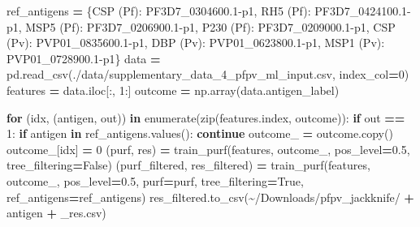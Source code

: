 \documentclass[
  11pt,
  oneside]{book}
\newenvironment{Shaded}{\begin{snugshade}}{\end{snugshade}}
\newcommand{\BuiltInTok}[1]{#1}
\newcommand{\ControlFlowTok}[1]{\textcolor[rgb]{0.13,0.29,0.53}{\textbf{#1}}}
\newcommand{\DecValTok}[1]{\textcolor[rgb]{0.00,0.00,0.81}{#1}}
\newcommand{\FloatTok}[1]{\textcolor[rgb]{0.00,0.00,0.81}{#1}}
\newcommand{\KeywordTok}[1]{\textcolor[rgb]{0.13,0.29,0.53}{\textbf{#1}}}
\newcommand{\NormalTok}[1]{#1}
\newcommand{\OperatorTok}[1]{\textcolor[rgb]{0.81,0.36,0.00}{\textbf{#1}}}
\newcommand{\StringTok}[1]{\textcolor[rgb]{0.31,0.60,0.02}{#1}}
\newcommand{\VariableTok}[1]{\textcolor[rgb]{0.00,0.00,0.00}{#1}}
\begin{document}
\begin{Shaded}
\begin{Highlighting}[]
\NormalTok{ref\_antigens }\OperatorTok{=}\NormalTok{ \{}\StringTok{\textquotesingle{}CSP (Pf)\textquotesingle{}}\NormalTok{: }\StringTok{\textquotesingle{}PF3D7\_0304600.1{-}p1\textquotesingle{}}\NormalTok{, }\StringTok{\textquotesingle{}RH5 (Pf)\textquotesingle{}}\NormalTok{: }\StringTok{\textquotesingle{}PF3D7\_0424100.1{-}p1\textquotesingle{}}\NormalTok{, }\StringTok{\textquotesingle{}MSP5 (Pf)\textquotesingle{}}\NormalTok{: }\StringTok{\textquotesingle{}PF3D7\_0206900.1{-}p1\textquotesingle{}}\NormalTok{,}
                \StringTok{\textquotesingle{}P230 (Pf)\textquotesingle{}}\NormalTok{: }\StringTok{\textquotesingle{}PF3D7\_0209000.1{-}p1\textquotesingle{}}\NormalTok{,}
                \StringTok{\textquotesingle{}CSP (Pv)\textquotesingle{}}\NormalTok{: }\StringTok{\textquotesingle{}PVP01\_0835600.1{-}p1\textquotesingle{}}\NormalTok{, }\StringTok{\textquotesingle{}DBP (Pv)\textquotesingle{}}\NormalTok{: }\StringTok{\textquotesingle{}PVP01\_0623800.1{-}p1\textquotesingle{}}\NormalTok{, }\StringTok{\textquotesingle{}MSP1 (Pv)\textquotesingle{}}\NormalTok{: }\StringTok{\textquotesingle{}PVP01\_0728900.1{-}p1\textquotesingle{}}\NormalTok{\}}
\NormalTok{data }\OperatorTok{=}\NormalTok{ pd.read\_csv(}\StringTok{\textquotesingle{}./data/supplementary\_data\_4\_pfpv\_ml\_input.csv\textquotesingle{}}\NormalTok{, index\_col}\OperatorTok{=}\DecValTok{0}\NormalTok{)}
\NormalTok{features }\OperatorTok{=}\NormalTok{ data.iloc[:, }\DecValTok{1}\NormalTok{:]}
\NormalTok{outcome }\OperatorTok{=}\NormalTok{ np.array(data.antigen\_label)}

\ControlFlowTok{for}\NormalTok{ (idx, (antigen, out)) }\KeywordTok{in} \BuiltInTok{enumerate}\NormalTok{(}\BuiltInTok{zip}\NormalTok{(features.index, outcome)):}
    \ControlFlowTok{if}\NormalTok{ out }\OperatorTok{==} \DecValTok{1}\NormalTok{:}
        \ControlFlowTok{if}\NormalTok{ antigen }\KeywordTok{in}\NormalTok{ ref\_antigens.values():}
            \ControlFlowTok{continue}
\NormalTok{        outcome\_ }\OperatorTok{=}\NormalTok{ outcome.copy()}
\NormalTok{        outcome\_[idx] }\OperatorTok{=} \DecValTok{0}
\NormalTok{        (purf, res) }\OperatorTok{=}\NormalTok{ train\_purf(features, outcome\_, pos\_level}\OperatorTok{=}\FloatTok{0.5}\NormalTok{, tree\_filtering}\OperatorTok{=}\VariableTok{False}\NormalTok{)}
\NormalTok{        (purf\_filtered, res\_filtered) }\OperatorTok{=}\NormalTok{ train\_purf(features, outcome\_, pos\_level}\OperatorTok{=}\FloatTok{0.5}\NormalTok{, purf}\OperatorTok{=}\NormalTok{purf, tree\_filtering}\OperatorTok{=}\VariableTok{True}\NormalTok{, ref\_antigens}\OperatorTok{=}\NormalTok{ref\_antigens)}
\NormalTok{        res\_filtered.to\_csv(}\StringTok{\textquotesingle{}\textasciitilde{}/Downloads/pfpv\_jackknife/\textquotesingle{}} \OperatorTok{+}\NormalTok{ antigen }\OperatorTok{+} \StringTok{\textquotesingle{}\_res.csv\textquotesingle{}}\NormalTok{)}
\end{Highlighting}
\end{Shaded}
\end{document}
